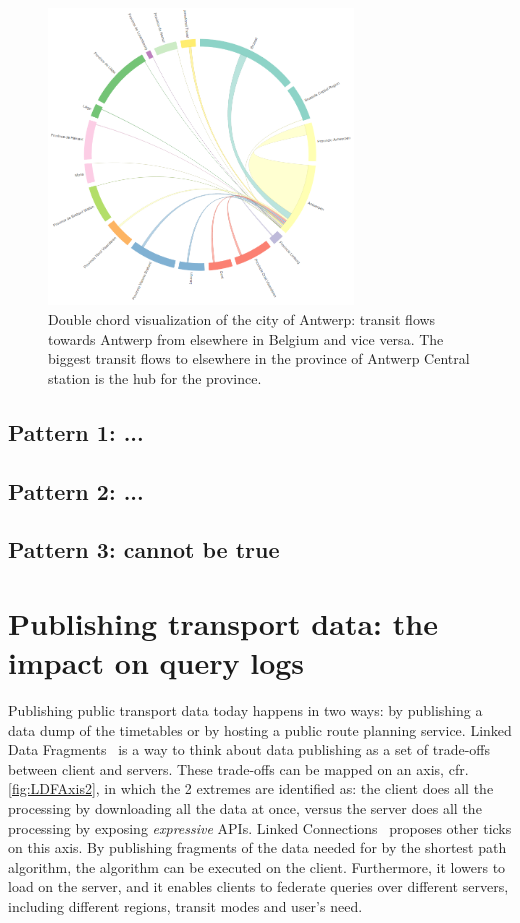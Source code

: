 \documentclass{sig-alternate}
\begin{document}
\begin{figure}
\centering
\includegraphics[width=8.1cm,align=center]{antwerp}
\caption{Double chord visualization of the city of Antwerp: transit flows towards Antwerp from elsewhere in Belgium and vice versa. The biggest transit flows to elsewhere in the province of Antwerp Central station is the hub for the province.}
\label{fig:antwerp}
\end{figure}

\subsection{Pattern 1: ...}
\label{sec:pattern1}

\subsection{Pattern 2: ...}
\label{sec:pattern2}

\subsection{Pattern 3: cannot be true}
\label{sec:pattern3}

\section{Publishing transport data: the impact on query logs}
\label{sec:publishing}

Publishing public transport data today happens in two ways: by publishing a data dump of the timetables or by hosting a public route planning service.
Linked Data Fragments~\cite{ldf} is a way to think about data publishing as a set of trade-offs between client and servers.
These trade-offs can be mapped on an axis, cfr. \cref{fig:LDFAxis2}, in which the 2 extremes are identified as: the client does all the processing by downloading all the data at once, versus the server does all the processing by exposing \emph{expressive} APIs.
Linked Connections~\cite{lc} proposes other ticks on this axis.
By publishing fragments of the data needed for by the shortest path algorithm, the algorithm can be executed on the client.
Furthermore, it lowers to load on the server, and it enables clients to federate queries over different servers, including different regions, transit modes and user's need.
\end{document}
